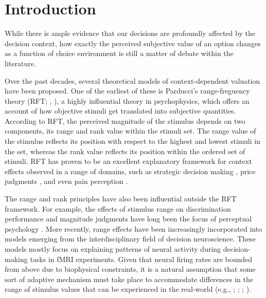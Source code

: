 \documentclass[11pt,a4paper]{article}
\begin{document}
	



\graphicspath{{./ADDM}} 

\section{Introduction} \label{chap1intro}



While there is ample evidence that our decisions are profoundly affected by the decision context, how exactly the perceived subjective value of an option changes as a function of choice environment is still a matter of debate within the literature. 

Over the past decades, several theoretical models of context-dependent valuation have been proposed. One of the earliest of these is Parducci's range-freguency theory (RFT; , ), a highly influential theory in psychophysics, which offers an account of how objective stimuli get translated into subjective quantities. According to RFT, the perceived magnitude of the stimulus depends on two components, its range and rank value within the stimuli set. The range value of the stimulus reflects its position with respect to the highest and lowest stimuli in the set, whereas the rank value reflects its position within the ordered set of stimuli. RFT has proven to be an excellent explanatory framework for context effects observed in a range of domains, such as strategic decision making \cite{Vlaev2006a}, price judgments \cite{Niedrich2009}, and even pain perception \cite{Watkinson2013}.  


The range and rank principles have also been influential outside the RFT framework. For example, the effects of stimulus range on discrimination performance and magnitude judgments have long been the focus of perceptual psychology \cite{Lockhead1986}. More recently, range effects have been increasingly incorporated into models emerging from the interdisciplinary field of decision neuroscience. These models mostly focus on explaining patterns of neural activity during decision-making tasks in fMRI experiments. Given that neural firing rates are bounded from above due to biophysical constraints, it is a natural assumption that some sort of adaptive mechanism must take place to accommodate differences in the range of stimulus values that can be experienced in the real-world (e.g., ; ; ; ).
\end{document}
